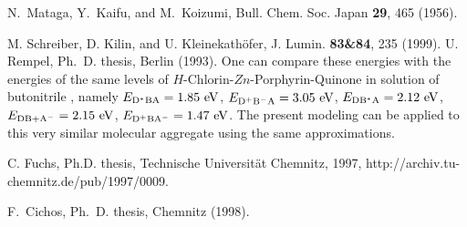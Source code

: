 \documentclass[12pt,twoside,a4paper]{report}
\begin{document}
{\begin{thebibliography}{999}
   N.~Mataga, Y.~Kaifu, and M.~Koizumi,
                   {Bull. Chem. Soc. Japan} {\bf 29}, 465 (1956). 

 M. Schreiber, D. Kilin, and U. Kleinekath\"{o}fer,
                 J. Lumin. {\bf 83\&84}, 235 (1999).
      U. Rempel, {Ph.~D. thesis}, Berlin (1993).
 {One can compare these energies with the energies of the same levels of
                    $H$-Chlorin-$Zn$-Porphyrin-Quinone in solution of butonitrile
                    \cite{j1}, namely $E_{\rm D^*BA}=1.85~ {\rm eV}$, $E_{\rm D^+B^-A}=3.05~ {\rm eV}$,
                    $E_{\rm DB^*A}=2.12~ {\rm eV}$, $E_{\rm DB+A^-}=2.15~ {\rm eV}$, $E_{\rm D^+BA^-}=1.47~ {\rm eV}$.
                    The present modeling can be applied to this very similar molecular aggregate
                    using the same approximations.}

 C. Fuchs, Ph.D. thesis, Technische
  Universit\"at Chemnitz, 1997,
  http://archiv.tu-chemnitz.de/pub/1997/0009.


  F.~Cichos, {Ph.~D. thesis}, Chemnitz (1998).
%






\end{thebibliography}}
\end{document}

